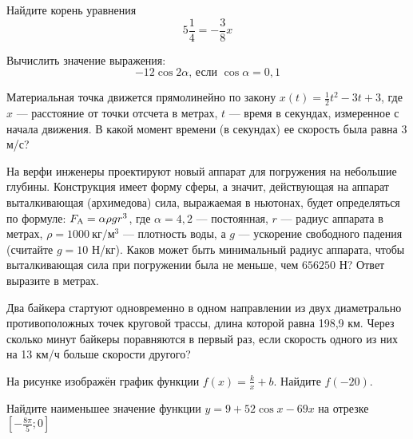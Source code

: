 \documentclass[twocolumn]{article}
\begin{document}
\begin{taskBN}{5}
Найдите корень уравнения $${5}\frac{1}{4}=-\frac{3}{8}x$$
\end{taskBN}

\begin{taskBN}{6}
Вычислить значение выражения: $$ {-12}\cos2\alpha\mbox{, если }\cos\alpha = {0,1}$$
\end{taskBN}

\begin{taskBN}{7}
Материальная точка движется прямолинейно по закону $x(t)=\frac{1}{2}t^{2}-3t+3$, где $x$ — расстояние от точки отсчета в метрах, $t$ — время в секундах, измеренное с начала движения. В какой момент времени (в секундах) ее скорость была равна $3$ м/с?
\end{taskBN}

\begin{taskBN}{8}
На верфи инженеры проектируют новый аппарат для погружения на небольшие глубины. Конструкция имеет форму сферы, а значит, действующая на аппарат выталкивающая (архимедова) сила, выражаемая в ньютонах, будет определяться по формуле:  $F_{\rm{A}}  = \alpha \rho gr^3$, где $\alpha  = 4,2$ — постоянная, $r$ — радиус аппарата в метрах, $\rho  = 1000~\mbox{кг}/\mbox{м}^3$ — плотность воды, а $g$ — ускорение свободного падения (считайте $g = 10$ Н/кг). Каков может быть минимальный радиус аппарата, чтобы выталкивающая сила при погружении была не меньше, чем $656250$ Н? Ответ выразите в метрах.
\end{taskBN}

\begin{taskBN}{9}
Два байкера стартуют одновременно в одном направлении из двух диаметрально противоположных точек круговой трассы, длина которой равна 198,9 км. Через сколько минут байкеры поравняются в первый раз, если скорость одного из них на 13 км/ч больше скорости другого? 
\end{taskBN}

\begin{taskBN}{10}
На рисунке изображён график функции $f(x)=\frac{k}{x}+b$. Найдите $f(-20)$.\vspace{2.5cm}
\end{taskBN}

\begin{taskBN}{11}
Найдите наименьшее значение функции $y = 9+52\cos x-69x$ на отрезке $[-\frac{8\pi}{5};0]$
\end{taskBN}
\end{document}
